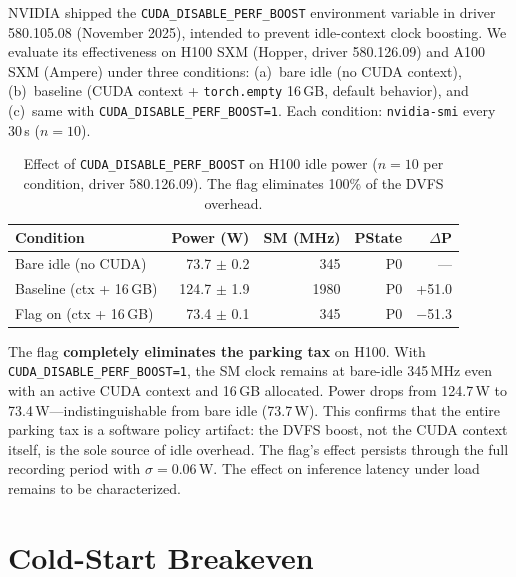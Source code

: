 \documentclass[sigconf,nonacm]{acmart}
\begin{document}
NVIDIA shipped the \texttt{CUDA\_DISABLE\_PERF\_BOOST} environment variable in driver 580.105.08 (November 2025), intended to prevent idle-context clock boosting. We evaluate its effectiveness on H100 SXM (Hopper, driver 580.126.09) and A100 SXM (Ampere) under three conditions: (a)~bare idle (no CUDA context), (b)~baseline (CUDA context + \texttt{torch.empty} 16\,GB, default behavior), and (c)~same with \texttt{CUDA\_DISABLE\_PERF\_BOOST=1}. Each condition: \texttt{nvidia-smi} every 30\,s ($n=10$).

\begin{table}[t]
\caption{Effect of \texttt{CUDA\_DISABLE\_PERF\_BOOST} on H100 idle power ($n=10$ per condition, driver 580.126.09). The flag eliminates 100\% of the DVFS overhead.}
\label{tab:perf-boost}
\small
\begin{tabular}{lrrrr}
\toprule
\textbf{Condition} & \textbf{Power (W)} & \textbf{SM (MHz)} & \textbf{PState} & $\Delta$\textbf{P} \\
\midrule
Bare idle (no CUDA) & 73.7 $\pm$ 0.2 & 345 & P0 & --- \\
Baseline (ctx + 16\,GB) & 124.7 $\pm$ 1.9 & 1980 & P0 & +51.0 \\
Flag on (ctx + 16\,GB) & 73.4 $\pm$ 0.1 & 345 & P0 & $-$51.3 \\
\bottomrule
\end{tabular}
\end{table}

The flag \textbf{completely eliminates the parking tax} on H100. With \texttt{CUDA\_DISABLE\_PERF\_BOOST=1}, the SM clock remains at bare-idle 345\,MHz even with an active CUDA context and 16\,GB allocated. Power drops from 124.7\,W to 73.4\,W---indistinguishable from bare idle (73.7\,W). This confirms that the entire parking tax is a software policy artifact: the DVFS boost, not the CUDA context itself, is the sole source of idle overhead. The flag's effect persists through the full recording period with $\sigma = 0.06$\,W. The effect on inference latency under load remains to be characterized.

\section{Cold-Start Breakeven}
\end{document}

